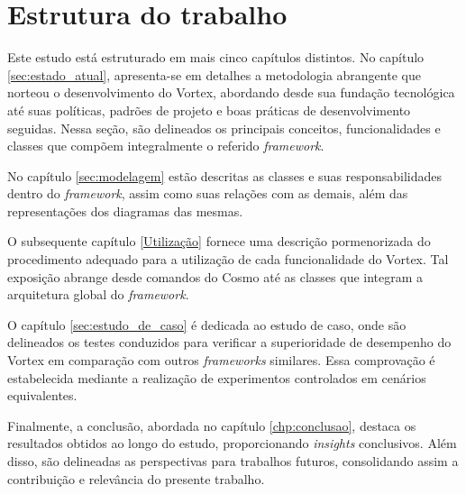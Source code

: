\section{Estrutura do trabalho}
Este estudo está estruturado em mais cinco capítulos distintos. No capítulo \ref{sec:estado_atual}, apresenta-se em detalhes a metodologia abrangente que norteou o desenvolvimento do Vortex, abordando desde sua fundação tecnológica até suas políticas, padrões de projeto e boas práticas de desenvolvimento seguidas. Nessa seção, são delineados os principais conceitos, funcionalidades e classes que compõem integralmente o referido \textit{framework}.

No capítulo \ref{sec:modelagem} estão descritas as classes e suas responsabilidades dentro do \textit{framework}, assim como suas relações com as demais, além das representações dos diagramas das mesmas.

O subsequente capítulo \ref{Utilização} fornece uma descrição pormenorizada do procedimento adequado para a utilização de cada funcionalidade do Vortex. Tal exposição abrange desde comandos do Cosmo até as classes que integram a arquitetura global do \textit{framework}.

O capítulo \ref{sec:estudo_de_caso} é dedicada ao estudo de caso, onde são delineados os testes conduzidos para verificar a superioridade de desempenho do Vortex em comparação com outros \textit{frameworks} similares. Essa comprovação é estabelecida mediante a realização de experimentos controlados em cenários equivalentes.

Finalmente, a conclusão, abordada no capítulo \ref{chp:conclusao}, destaca os resultados obtidos ao longo do estudo, proporcionando \textit{insights} conclusivos. Além disso, são delineadas as perspectivas para trabalhos futuros, consolidando assim a contribuição e relevância do presente trabalho.
